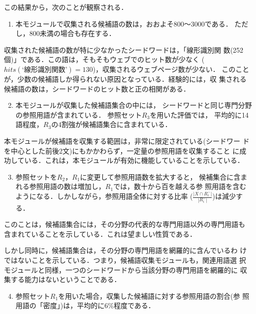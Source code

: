 この結果から，次のことが観察される．
\begin{enumerate}
\item
本モジュールで収集される候補語の数は，おおよそ800〜3000である．
ただし，800未満の場合も存在する．
\end{enumerate}

収集された候補語の数が特に少なかったシードワードは，「線形識別関
数(252個)」である．この語は，そもそもウェブでのヒット数が少なく
($hits(\text{`線形識別関数'})=130$)，収集されるウェブページ数が少ない．
このことが，少数の候補語しか得られない原因となっている．経験的には，収
集される候補語の数は，シードワードのヒット数と正の相関がある．

\begin{enumerate} \setcounter{enumi}{1}
\item 
本モジュールが収集した候補語集合の中には，
シードワードと同じ専門分野の参照用語が含まれている．
参照セット$R_3$を用いた評価では，
平均的に14語程度，$R_3$の4割強が候補語集合に含まれている．
\end{enumerate}

本モジュールが候補語を収集する範囲は，非常に限定されている(シードワー
ドを中心とした前後2文)にもかかわらず，一定量の参照用語を収集すること
に成功している．これは，本モジュールが有効に機能していることを示している．

\begin{enumerate} \setcounter{enumi}{2}
\item 
参照セットを$R_2$，$R_1$に変更して参照用語数を拡大すると，
候補集合に含まれる参照用語の数は増加し，$R_1$では，数十から百を越える参
照用語を含むようになる．しかしながら，参照用語全体に対する比率
($\frac{|X\cap R_i^{-}|}{|R_i^{-}|}$)は減少する．
\end{enumerate}

このことは，候補語集合には，その分野の代表的な専門用語以外の専門用語も
含まれていることを示している．これは望ましい性質である．

しかし同時に，候補語集合は，その分野の専門用語を網羅的に含んでいるわ
けではないことを示している．つまり，候補語収集モジュールも，関連用語選
択モジュールと同様，一つのシードワードから当該分野の専門用語を網羅的に
収集する能力はないということである．

\begin{enumerate} \setcounter{enumi}{3}
\item 
参照セット$R_1$を用いた場合，収集した候補語に対する参照用語の割合(参
照用語の「密度」)は，平均的に6\%程度である．
\end{enumerate}

